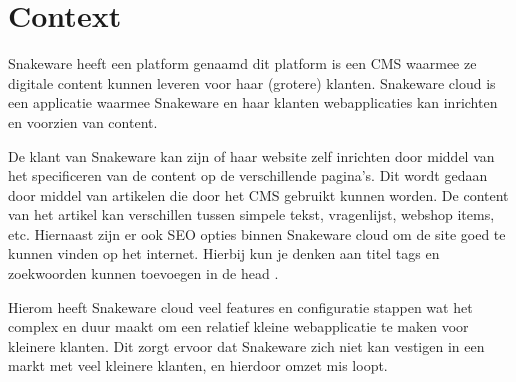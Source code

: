 \section{Context}
Snakeware heeft een platform genaamd  dit platform is een \gls{CMS} waarmee ze digitale content kunnen leveren voor haar (grotere) klanten.
Snakeware cloud is een applicatie waarmee Snakeware en haar klanten webapplicaties kan inrichten en voorzien van content.

\whitespace[2]
De klant van Snakeware kan zijn of haar website zelf inrichten door middel van het specificeren van de content op de verschillende pagina’s.
Dit wordt gedaan door middel van artikelen die door het \gls{CMS} gebruikt kunnen worden.
De content van het artikel kan verschillen tussen simpele tekst, vragenlijst, webshop items, etc.
Hiernaast zijn er ook \gls{SEO} opties binnen Snakeware cloud om de site goed te kunnen vinden op het internet.
Hierbij kun je denken aan titel tags en zoekwoorden kunnen toevoegen in de head \Parencite{HTMLhead}.

\whitespace[2]
Hierom heeft Snakeware cloud veel features en configuratie stappen wat het complex en duur maakt om een relatief kleine webapplicatie te maken voor kleinere klanten.
Dit zorgt ervoor dat Snakeware zich niet kan vestigen in een markt met veel kleinere klanten, en hierdoor omzet mis loopt.

